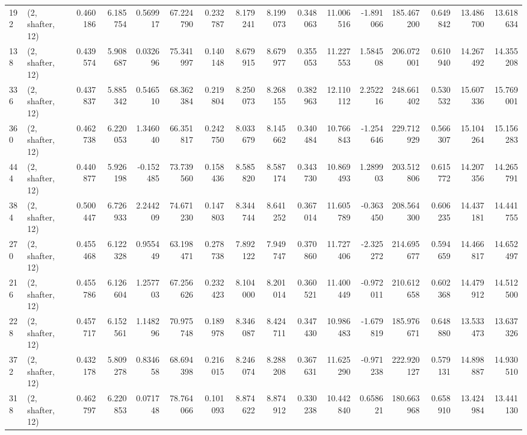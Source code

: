 \begin{tabular}{llrrrrrrrrrrrrrr}
192 &  (2, shafter, 12) &   0.460186 &   6.185754 &   0.569917 &    67.224790 &   0.232787 &   8.179241 &   8.199073 &  0.348063 &  11.006516 &  -1.891066 &   185.467200 &  0.649842 &  13.486700 &  13.618634 \\
138 &  (2, shafter, 12) &   0.439574 &   5.908687 &   0.032696 &    75.341997 &   0.140148 &   8.679915 &   8.679977 &  0.355053 &  11.227553 &   1.584508 &   206.072001 &  0.610940 &  14.267492 &  14.355208 \\
336 &  (2, shafter, 12) &   0.437837 &   5.885342 &   0.546510 &    68.362384 &   0.219804 &   8.250073 &   8.268155 &  0.382963 &  12.110112 &   2.252216 &   248.661402 &  0.530532 &  15.607336 &  15.769001 \\
360 &  (2, shafter, 12) &   0.462738 &   6.220053 &   1.346040 &    66.351817 &   0.242750 &   8.033679 &   8.145662 &  0.340484 &  10.766843 &  -1.254646 &   229.712929 &  0.566307 &  15.104264 &  15.156283 \\
444 &  (2, shafter, 12) &   0.440877 &   5.926198 &  -0.152485 &    73.739560 &   0.158436 &   8.585820 &   8.587174 &  0.343730 &  10.869493 &   1.289903 &   203.512806 &  0.615772 &  14.207356 &  14.265791 \\
384 &  (2, shafter, 12) &   0.500447 &   6.726933 &   2.244209 &    74.671230 &   0.147803 &   8.344744 &   8.641252 &  0.367014 &  11.605789 &  -0.363450 &   208.564300 &  0.606235 &  14.437181 &  14.441755 \\
270 &  (2, shafter, 12) &   0.455468 &   6.122328 &   0.955449 &    63.198471 &   0.278738 &   7.892122 &   7.949747 &  0.370860 &  11.727406 &  -2.325272 &   214.695677 &  0.594659 &  14.466817 &  14.652497 \\
216 &  (2, shafter, 12) &   0.455786 &   6.126604 &   1.257703 &    67.256626 &   0.232423 &   8.104000 &   8.201014 &  0.360521 &  11.400449 &  -0.972011 &   210.612658 &  0.602368 &  14.479912 &  14.512500 \\
228 &  (2, shafter, 12) &   0.457717 &   6.152561 &   1.148296 &    70.975748 &   0.189978 &   8.346087 &   8.424711 &  0.347430 &  10.986483 &  -1.679819 &   185.976671 &  0.648880 &  13.533473 &  13.637326 \\
372 &  (2, shafter, 12) &   0.432178 &   5.809278 &   0.834658 &    68.694398 &   0.216015 &   8.246074 &   8.288208 &  0.367631 &  11.625290 &  -0.971238 &   222.920127 &  0.579131 &  14.898887 &  14.930510 \\
318 &  (2, shafter, 12) &   0.462797 &   6.220853 &   0.071748 &    78.764066 &   0.101093 &   8.874622 &   8.874912 &  0.330238 &  10.442840 &   0.658621 &   180.663968 &  0.658910 &  13.424984 &  13.441130 \\

\end{tabular}
